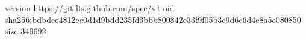 version https://git-lfs.github.com/spec/v1
oid sha256:bdbdee4812ec0d1d9bdd235fd3bbb800842e33f9f05b3c9d6c6d4e8a5e080850
size 349692
